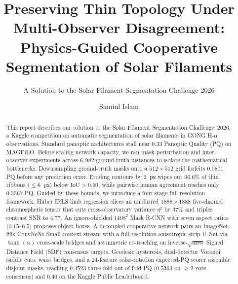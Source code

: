\documentclass[sigconf]{acmart}
\begin{document}
\setlength{\abovedisplayskip}{4.2pt plus 1pt minus 1pt}
\setlength{\belowdisplayskip}{4.2pt plus 1pt minus 1pt}
\setlength{\textfloatsep}{8pt plus 2pt minus 2pt}
\setlength{\dbltextfloatsep}{8pt plus 2pt minus 2pt}

\title[Topology-Preserving Cooperative Filament Segmentation]{Preserving Thin Topology Under Multi-Observer Disagreement: Physics-Guided Cooperative Segmentation of Solar Filaments}
\subtitle{A Solution to the Solar Filament Segmentation Challenge 2026} %

\author{Samiul Islam}

\begin{abstract}
    This report describes our solution to the Solar Filament Segmentation Challenge~2026, a Kaggle competition on automatic segmentation of solar filaments in GONG H-$\alpha$ observations. Standard panoptic architectures stall near $0.33$ Panoptic Quality (PQ) on MAGFiLO. Before scaling network capacity, we ran mask-perturbation and inter-observer experiments across $6{,}982$ ground-truth instances to isolate the mathematical bottlenecks. Downsampling ground-truth masks onto a $512 \times 512$ grid forfeits $0.0801$ PQ before any prediction error. Eroding contours by $2$~px wipes out $96.6\%$ of thin ribbons ($\le 6$~px) below $\text{IoU} > 0.50$, while pairwise human agreement reaches only $0.3367$ PQ. Guided by these bounds, we introduce a four-stage full-resolution framework. Huber IRLS limb regression slices an unblurred $1888 \times 1888$ five-channel chromospheric tensor that cuts cross-observatory variance $\eta^2$ by $37\%$ and triples contrast SNR to $4.77$. An ignore-shielded $1408^2$ Mask R-CNN with seven aspect ratios ($0.15$--$6.5$) proposes object boxes. A decoupled cooperative network pairs an ImageNet-22k ConvNeXt-Small context stream with a full-resolution anisotropic strip U-Net via $\tanh(\alpha)$ cross-scale bridges and asymmetric co-teaching on inverse-$\sqrt{\text{area}}$ Signed Distance Field (SDF) consensus targets. Geodesic hysteresis, dual-detector Voronoi saddle cuts, waist bridges, and a $24$-feature solar-rotation expected-PQ scorer assemble disjoint masks, reaching $0.4523$ three-fold out-of-fold PQ ($0.5363$ on $\ge 2$-vote consensus) and $0.40$ on the Kaggle Public Leaderboard.
\end{abstract}

\maketitle
\end{document}
